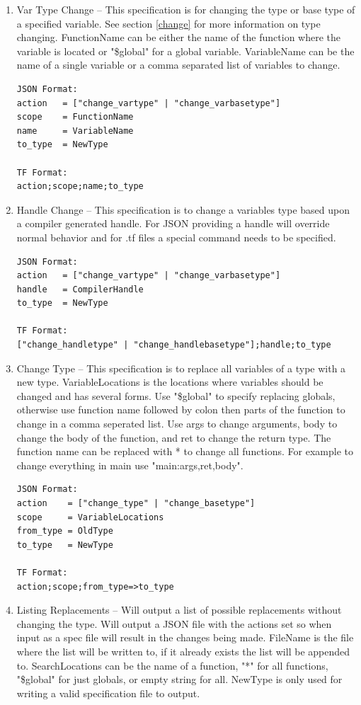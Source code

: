\documentclass[natbib]{article}
\begin{document}
\begin{enumerate}
\item{} Var Type Change -- This specification is for changing the type or base type 
of a specified variable. See section \ref{change} for more information on type changing. 
FunctionName can be either the name of the function where the variable is located or "\$global" 
for a global variable. VariableName can be the name of a single variable or a comma separated 
list of variables to change.
\begin{verbatim}
JSON Format:
action   = ["change_vartype" | "change_varbasetype"]
scope    = FunctionName
name     = VariableName
to_type  = NewType

TF Format:
action;scope;name;to_type
\end{verbatim}

\item{} Handle Change -- This specification is to change a variables type based upon 
a compiler generated handle. For JSON providing a handle will override normal behavior 
and for .tf files a special command needs to be specified.

\begin{verbatim}
JSON Format:
action   = ["change_vartype" | "change_varbasetype"]
handle   = CompilerHandle
to_type  = NewType

TF Format:
["change_handletype" | "change_handlebasetype"];handle;to_type
\end{verbatim}

\item{} Change Type -- This specification is to replace all variables of a type with a new type. 
VariableLocations is the locations where variables should be changed and has several forms. 
Use "\$global" to specify replacing globals, otherwise use function name followed by colon 
then parts of the function to change in a comma seperated list. Use args to change arguments, 
body to change the body of the function, and ret to change the return type. The function name 
can be replaced with * to change all functions. For example to change everything in main use 
"main:args,ret,body".

\begin{verbatim}
JSON Format:
action    = ["change_type" | "change_basetype"]
scope     = VariableLocations
from_type = OldType
to_type   = NewType

TF Format:
action;scope;from_type=>to_type
\end{verbatim}

\item{} Listing Replacements -- Will output a list of possible replacements without 
changing the type. Will output a JSON file with the actions set so when input as a 
spec file will result in the changes being made. FileName is the file where the list will be 
written to, if it already exists the list will be appended to. SearchLocations can be the name 
of a function, "*" for all functions, "\$global" for just globals, or empty string for all. 
NewType is only used for writing a valid specification file to output.


\end{enumerate}
\end{document}
